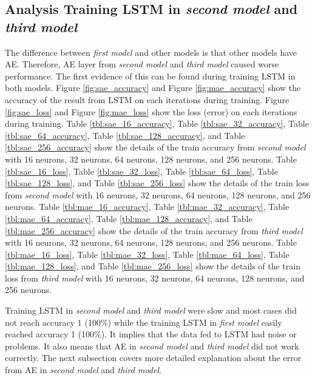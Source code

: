\documentclass[draft,dvipsnames]{drexel-thesis}
\begin{document}
\begin{thesis}
\subsection{Analysis Training LSTM in {\em second model} and {\em third model}}
The difference between {\em first model} and other models is that other models have AE. Therefore, AE layer from {\em second model} and {\em third model} caused worse performance. The first evidence of this can be found during training LSTM in both models. Figure \ref{fig:sae_accuracy} and Figure \ref{fig:mae_accuracy} show the accuracy of the result from LSTM on each iterations during training. Figure \ref{fig:sae_loss} and Figure \ref{fig:mae_loss} show the loss (error) on each iterations during training. Table \ref{tbl:sae_16_accuracy}, Table \ref{tbl:sae_32_accuracy}, Table \ref{tbl:sae_64_accuracy}, Table \ref{tbl:sae_128_accuracy}, and Table \ref{tbl:sae_256_accuracy} show the details of the train accuracy from {\em second model} with 16 neurons, 32 neurons, 64 neurons, 128 neurons, and 256 neurons. Table \ref{tbl:sae_16_loss}, Table \ref{tbl:sae_32_loss}, Table \ref{tbl:sae_64_loss}, Table \ref{tbl:sae_128_loss}, and Table \ref{tbl:sae_256_loss} show the details of the train loss from {\em second model} with 16 neurons, 32 neurons, 64 neurons, 128 neurons, and 256 neurons. Table \ref{tbl:mae_16_accuracy}, Table \ref{tbl:mae_32_accuracy}, Table \ref{tbl:mae_64_accuracy}, Table \ref{tbl:mae_128_accuracy}, and Table \ref{tbl:mae_256_accuracy} show the details of the train accuracy from {\em third model} with 16 neurons, 32 neurons, 64 neurons, 128 neurons, and 256 neurons. Table \ref{tbl:mae_16_loss}, Table \ref{tbl:mae_32_loss}, Table \ref{tbl:mae_64_loss}, Table \ref{tbl:mae_128_loss}, and Table \ref{tbl:mae_256_loss} show the details of the train loss from {\em third model} with 16 neurons, 32 neurons, 64 neurons, 128 neurons, and 256 neurons.

Training LSTM in {\em second model} and {\em third model} were slow and most cases did not reach accuracy 1 (100\%) while the training LSTM in {\em first model} easily reached accuracy 1 (100\%). It implies that the data fed to LSTM had noise or problems. It also means that AE in {\em second model} and {\em third model} did not work correctly. The next subsection covers more detailed explanation about the error from AE in {\em second model} and {\em third model}.


\end{thesis}
\end{document}
